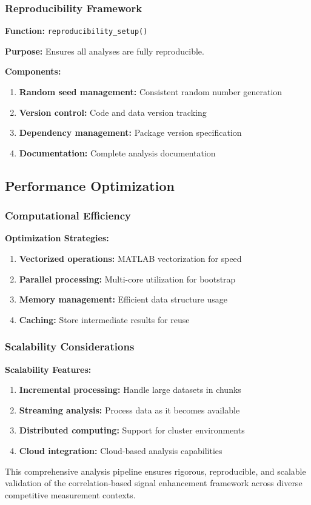 \subsubsection{Reproducibility Framework}

\textbf{Function:} \texttt{reproducibility\_setup()}

\textbf{Purpose:} Ensures all analyses are fully reproducible.

\textbf{Components:}
\begin{enumerate}
    \item \textbf{Random seed management:} Consistent random number generation
    \item \textbf{Version control:} Code and data version tracking
    \item \textbf{Dependency management:} Package version specification
    \item \textbf{Documentation:} Complete analysis documentation
\end{enumerate}

\subsection{Performance Optimization}

\subsubsection{Computational Efficiency}

\textbf{Optimization Strategies:}
\begin{enumerate}
    \item \textbf{Vectorized operations:} MATLAB vectorization for speed
    \item \textbf{Parallel processing:} Multi-core utilization for bootstrap
    \item \textbf{Memory management:} Efficient data structure usage
    \item \textbf{Caching:} Store intermediate results for reuse
\end{enumerate}

\subsubsection{Scalability Considerations}

\textbf{Scalability Features:}
\begin{enumerate}
    \item \textbf{Incremental processing:} Handle large datasets in chunks
    \item \textbf{Streaming analysis:} Process data as it becomes available
    \item \textbf{Distributed computing:} Support for cluster environments
    \item \textbf{Cloud integration:} Cloud-based analysis capabilities
\end{enumerate}

This comprehensive analysis pipeline ensures rigorous, reproducible, and scalable validation of the correlation-based signal enhancement framework across diverse competitive measurement contexts.
